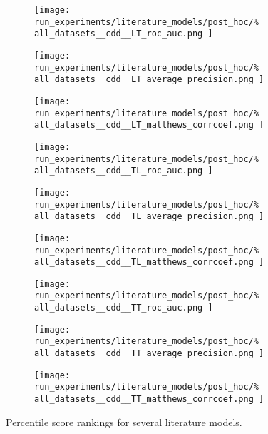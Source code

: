 \documentclass[conference]{IEEEtran}
\begin{document}
\begin{figure*}
    \centering
    \begin{subfigure}{0.32\textwidth}
        \texttt{[image: 
            run\_experiments/literature\_models/post\_hoc/\%
            all\_datasets\_\_cdd\_\_LT\_roc\_auc.png
        ]}
    \end{subfigure}
    \begin{subfigure}{0.32\textwidth}
        \texttt{[image: 
            run\_experiments/literature\_models/post\_hoc/\%
            all\_datasets\_\_cdd\_\_LT\_average\_precision.png
        ]}
    \end{subfigure}
    \begin{subfigure}{0.32\textwidth}
        \texttt{[image: 
            run\_experiments/literature\_models/post\_hoc/\%
            all\_datasets\_\_cdd\_\_LT\_matthews\_corrcoef.png
        ]}
    \end{subfigure}

    \begin{subfigure}{0.32\textwidth}
        \texttt{[image: 
            run\_experiments/literature\_models/post\_hoc/\%
            all\_datasets\_\_cdd\_\_TL\_roc\_auc.png
        ]}
    \end{subfigure}
    \begin{subfigure}{0.32\textwidth}
        \texttt{[image: 
            run\_experiments/literature\_models/post\_hoc/\%
            all\_datasets\_\_cdd\_\_TL\_average\_precision.png
        ]}
    \end{subfigure}
    \begin{subfigure}{0.32\textwidth}
        \texttt{[image: 
            run\_experiments/literature\_models/post\_hoc/\%
            all\_datasets\_\_cdd\_\_TL\_matthews\_corrcoef.png
        ]}
    \end{subfigure}

    \begin{subfigure}{0.32\textwidth}
        \texttt{[image: 
            run\_experiments/literature\_models/post\_hoc/\%
            all\_datasets\_\_cdd\_\_TT\_roc\_auc.png
        ]}
    \end{subfigure}
    \begin{subfigure}{0.32\textwidth}
        \texttt{[image: 
            run\_experiments/literature\_models/post\_hoc/\%
            all\_datasets\_\_cdd\_\_TT\_average\_precision.png
        ]}
    \end{subfigure}
    \begin{subfigure}{0.32\textwidth}
        \texttt{[image: 
            run\_experiments/literature\_models/post\_hoc/\%
            all\_datasets\_\_cdd\_\_TT\_matthews\_corrcoef.png
        ]}
    \end{subfigure}
    \caption{Percentile score rankings for several literature models.}
    \label{fig:cdd_literature}
\end{figure*}
\end{document}
